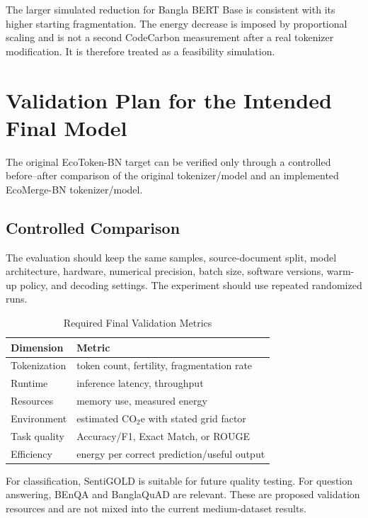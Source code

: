 \documentclass[conference]{IEEEtran}
\begin{document}
The larger simulated reduction for Bangla BERT Base is consistent with its higher starting fragmentation. The energy decrease is imposed by proportional scaling and is not a second CodeCarbon measurement after a real tokenizer modification. It is therefore treated as a feasibility simulation.

\section{Validation Plan for the Intended Final Model}
The original EcoToken-BN target can be verified only through a controlled before--after comparison of the original tokenizer/model and an implemented EcoMerge-BN tokenizer/model.

\subsection{Controlled Comparison}
The evaluation should keep the same samples, source-document split, model architecture, hardware, numerical precision, batch size, software versions, warm-up policy, and decoding settings. The experiment should use repeated randomized runs.

\begin{table}[htbp]
\caption{Required Final Validation Metrics}
\label{tab:finalmetrics}
\centering
\scriptsize
\begin{tabular}{p{} p{}}
\toprule
\textbf{Dimension} & \textbf{Metric}\\
\midrule
Tokenization & token count, fertility, fragmentation rate\\
Runtime & inference latency, throughput\\
Resources & memory use, measured energy\\
Environment & estimated CO$_2$e with stated grid factor\\
Task quality & Accuracy/F1, Exact Match, or ROUGE\\
Efficiency & energy per correct prediction/useful output\\
\bottomrule
\end{tabular}
\end{table}

For classification, SentiGOLD \cite{islam2023} is suitable for future quality testing. For question answering, BEnQA \cite{shafayat2024} and BanglaQuAD \cite{rony2024} are relevant. These are proposed validation resources and are not mixed into the current medium-dataset results.
\end{document}
